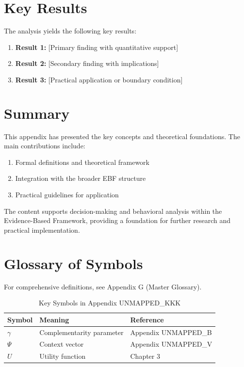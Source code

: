 \section{Key Results}
\label{sec:kkk-results}

The analysis yields the following key results:

\begin{enumerate}
    \item \textbf{Result 1:} [Primary finding with quantitative support]
    \item \textbf{Result 2:} [Secondary finding with implications]
    \item \textbf{Result 3:} [Practical application or boundary condition]
\end{enumerate}


\section{Summary}
\label{sec:kkk-summary}

This appendix has presented the key concepts and theoretical foundations.
The main contributions include:

\begin{enumerate}
    \item Formal definitions and theoretical framework
    \item Integration with the broader EBF structure
    \item Practical guidelines for application
\end{enumerate}

The content supports decision-making and behavioral analysis within the
Evidence-Based Framework, providing a foundation for further research
and practical implementation.



\section{Glossary of Symbols}
\label{sec:kkk-glossary}

For comprehensive definitions, see Appendix G (Master Glossary).

\begin{table}[htbp]
\centering
\caption{Key Symbols in Appendix UNMAPPED_KKK}
\begin{tabular}{lll}
\toprule
\textbf{Symbol} & \textbf{Meaning} & \textbf{Reference} \\
\midrule
$\gamma$ & Complementarity parameter & Appendix UNMAPPED_B \\
$\Psi$ & Context vector & Appendix UNMAPPED_V \\
$U$ & Utility function & Chapter 3 \\
\bottomrule
\end{tabular}
\end{table}



